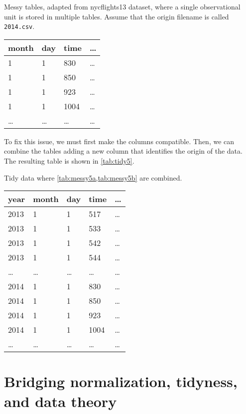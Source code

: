 \begin{tablebox}[label=tab:messy5b]{Messy tables, adapted from nycflights13 dataset, where
  a single observational unit is stored in multiple tables.  Assume that the origin
  filename is called \texttt{2014.csv}.}
  \centering
  \begin{tabular}{llll}
    \toprule
    month & day & time & \dots \\
    \midrule
    1 & 1 & 830 & \dots \\
    1 & 1 & 850 & \dots \\
    1 & 1 & 923 & \dots \\
    1 & 1 & 1004 & \dots \\
    \dots & \dots & \dots & \dots \\
    \bottomrule
  \end{tabular}
\end{tablebox}

To fix this issue, we must first make the columns compatible.  Then, we can combine the
tables adding a new column that identifies the origin of the data.  The resulting table is
shown in \cref{tab:tidy5}.

\begin{tablebox}[label=tab:tidy5]{Tidy data where \cref{tab:messy5a,tab:messy5b} are combined.}
  \centering
  \begin{tabular}{lllll}
    \toprule
    year & month & day & time & \dots \\
    \midrule
    2013 & 1 & 1 & 517 & \dots \\
    2013 & 1 & 1 & 533 & \dots \\
    2013 & 1 & 1 & 542 & \dots \\
    2013 & 1 & 1 & 544 & \dots \\
    \dots & \dots & \dots & \dots & \dots \\
    2014 & 1 & 1 & 830 & \dots \\
    2014 & 1 & 1 & 850 & \dots \\
    2014 & 1 & 1 & 923 & \dots \\
    2014 & 1 & 1 & 1004 & \dots \\
    \dots & \dots & \dots & \dots & \dots \\
    \bottomrule
  \end{tabular}
\end{tablebox}

\clearpage
\section{Bridging normalization, tidyness, and data theory}
\label{sub:bridge}

